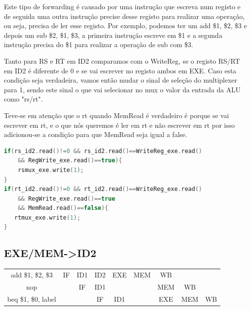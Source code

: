 \documentclass[pdftex,12pt,a4paper]{report}
\begin{document}
Este tipo de forwarding é causado por uma instrução que escreva num registo e de seguida uma outra instrução precise desse registo para realizar uma operação, ou seja, precisa de ler esse registo. Por exemplo, podemos ter um add \$1, \$2, \$3 e depois um sub \$2, \$1, \$3, a primeira instrução escreve em \$1 e a segunda instrução precisa do \$1  para realizar a operação de sub com \$3.
\linebreak

Tanto para RS e RT em ID2 comparamos com o WriteReg, se o registo RS/RT em ID2 é diferente de 0 e se vai escrever no registo ambos em EXE. 
Caso esta condição seja verdadeira, vamos então mudar o sinal de seleção do multiplexer para 1, sendo este sinal o que vai selecionar no mux o valor da entrada da ALU como "rs/rt".

Teve-se em atenção que o rt quando MemRead é verdadeiro é porque se vai escrever em rt, e o que nós queremos é ler em rt e não escrever em rt por isso adicionou-se a condição para que MemRead seja igual a false.
\linebreak

\begin{lstlisting}[language=c]
if(rs_id2.read()!=0 && rs_id2.read()==WriteReg_exe.read() 
	&& RegWrite_exe.read()==true){
    rsmux_exe.write(1); 
}
if(rt_id2.read()!=0 && rt_id2.read()==WriteReg_exe.read() 
	&& RegWrite_exe.read()==true 
	&& MemRead.read()==false){
   rtmux_exe.write(1);
}
\end{lstlisting} 

\subsection{EXE/MEM->ID2}

\begin{table}[!htb]
\centering
\label{table_exe_mem_id2}
\begin{tabular}{ccc|c|c|c|c|cc}
\cline{2-7}
\multicolumn{1}{c|}{add \$1, \$2, \$3} & \multicolumn{1}{c|}{IF} & ID1 & ID2 & \cellcolor[HTML]{F8A102}EXE                        & \cellcolor[HTML]{FFCC67}MEM                        & WB  &                          &                         \\ \cline{2-8}
nop                                  & \multicolumn{1}{c|}{}   & IF  & ID1 & \cellcolor[HTML]{FFFFFF}{\color[HTML]{000000} ID2} & \cellcolor[HTML]{FFFFFF}{\color[HTML]{333333} EXE} & MEM & \multicolumn{1}{c|}{WB}  &                         \\ \cline{3-9} 
beq \$1, \$0, label                      &                         &     & IF  & ID1                                                & \cellcolor[HTML]{F8A102}{\color[HTML]{333333} ID2} & EXE & \multicolumn{1}{c|}{MEM} & \multicolumn{1}{c|}{WB} \\ \cline{4-9} 
\end{tabular}
\end{table}
\end{document}
